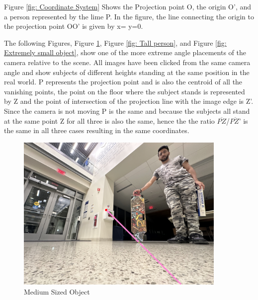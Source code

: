 \documentclass[12pt]{report}
\begin{document}
Figure \ref{fig: Coordinate System} Shows the Projection point O, the origin O’, and a person represented by the lime P. In the figure, the line connecting the origin to the projection point OO' is given by x= y=0.\newline

The following Figures, Figure \ref{fig: Medium sized object}, Figure \ref{fig: Tall person}, and Figure \ref{fig: Extremely small object}, show one of the more extreme angle placements of the camera relative to the scene. All images have been clicked from the same camera angle and show subjects of different heights standing at the same position in the real world. P represents the projection point and is also the centroid of all the vanishing points, the point on the floor where the subject stands is represented by Z and the point of intersection of the projection line with the image edge is Z’. Since the camera is not moving P is the same and because the subjects all stand at the same point Z for all three is also the same, hence the the ratio $\overline{PZ}$/$\overline{PZ’}$ is the same in all three cases resulting in the same coordinates.\newline

\begin{figure}[H]
    \centering
    \includegraphics[width=0.9\textwidth]{3vpmo.jpeg}
    \caption{Medium Sized Object}
    \label{fig: Medium sized object}
\end{figure}
\end{document}
